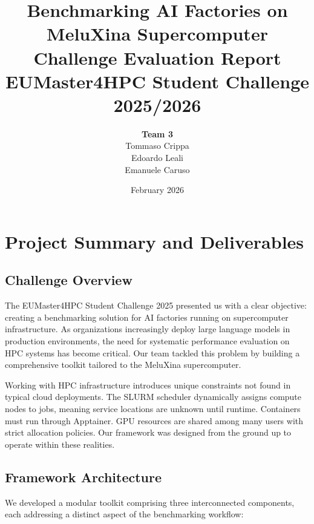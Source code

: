 \documentclass[12pt,a4paper]{article}
\title{
    \vspace{-1cm}
    \textbf{Benchmarking AI Factories on MeluXina Supercomputer}\\
    \large Challenge Evaluation Report\\
    \vspace{0.5cm}
    \normalsize EUMaster4HPC Student Challenge 2025/2026
}
\author{
    \textbf{Team 3}\\[0.3cm]
    Tommaso Crippa\\
    Edoardo Leali\\
    Emanuele Caruso
}
\date{February 2026}
\begin{document}
\maketitle

\newpage

\section{Project Summary and Deliverables}

\subsection{Challenge Overview}

The EUMaster4HPC Student Challenge 2025 presented us with a clear objective: creating a benchmarking solution for AI factories running on supercomputer infrastructure. As organizations increasingly deploy large language models in production environments, the need for systematic performance evaluation on HPC systems has become critical. Our team tackled this problem by building a comprehensive toolkit tailored to the MeluXina supercomputer.

Working with HPC infrastructure introduces unique constraints not found in typical cloud deployments. The SLURM scheduler dynamically assigns compute nodes to jobs, meaning service locations are unknown until runtime. Containers must run through Apptainer. GPU resources are shared among many users with strict allocation policies. Our framework was designed from the ground up to operate within these realities.

\subsection{Framework Architecture}

We developed a modular toolkit comprising three interconnected components, each addressing a distinct aspect of the benchmarking workflow:
\end{document}

